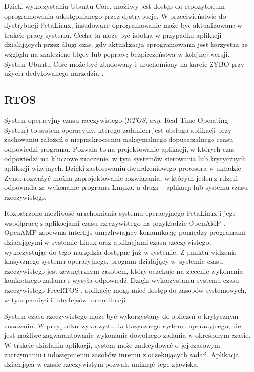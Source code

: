 Dzięki wykorzystaniu Ubuntu Core, możliwy jest dostęp do repozytorium oprogramowania udostępnianego przez dystrybucję. 
W przeciwieństwie do dystrybucji PetaLinux, instalowane oprogramowanie może być aktualizowane w trakcie pracy systemu. 
Cecha ta może być istotna w przypadku aplikacji działających przez długi czas, gdy aktualizacja oprogramowania jest korzystna ze względu na znalezione błędy lub poprawę bezpieczeństwa w kolejnej wersji. 
System Ubuntu Core może być zbudowany i uruchomiony na karcie ZYBO przy użyciu dedykowanego narzędzia \cite{ubuntu-core-zybo}.


\subsection{RTOS}

System operacyjny czasu rzeczywistego (\emph{RTOS}, \emph{ang.} Real Time Operating System) to system operacyjny, którego zadaniem jest obsługa aplikacji przy zachowaniu założeń o nieprzekroczeniu maksymalnego dopuszczalnego czasu odpowiedzi programu. 
Pozwala to na projektowanie aplikacji, w których czas odpowiedzi ma kluczowe znaczenie, w tym systemów sterowania lub krytycznych aplikacji wizyjnych.
Dzięki zastosowaniu dwurdzeniowego procesora w układzie Zynq, rozważyć można zaprojektowanie rozwiązania, w których jeden z rdzeni odpowiada za wykonanie programu Linuxa, a drugi -- aplikacji lub systemu czasu rzeczywistego.

Rozpatrzono możliwość uruchomienia systemu operacyjnego PetaLinux i jego współpracę z aplikacjami czasu rzeczywistego na przykładzie OpenAMP \cite{openamp-home}. 
OpenAMP zapewnia interfejs umożliwiający komunikację pomiędzy programami działającymi w systemie Linux oraz aplikacjami czasu rzeczywistego, wykorzystując do tego narzędzia dostępne już w systemie.
Z punktu widzenia klasycznego systemu operacyjnego, program działający w~systemie czasu rzeczywistego jest zewnętrznym zasobem, który oczekuje na zlecenie wykonania konkretnego zadania i wysyła odpowiedź.
Dzięki wykorzystaniu systemu czasu rzeczywistego FreeRTOS \cite{freeRTOS-home}, aplikacje mogą mieć dostęp do zasobów systemowych, w tym pamięci i interfejsów komunikacji.

System czasu rzeczywistego może być wykorzystany do obliczeń o krytycznym znaczeniu. 
W przypadku wykorzystania klasycznego systemu operacyjnego, nie jest możliwe zagwarantowanie wykonania dowolnego zadania w określonym czasie. 
W trakcie działania aplikacji, system może zadecydować o jej czasowym zatrzymaniu i udostępnieniu zasobów innemu z oczekujących zadań. 
Aplikacja działająca w czasie rzeczywistym pozwala uniknąć tego zjawiska.

